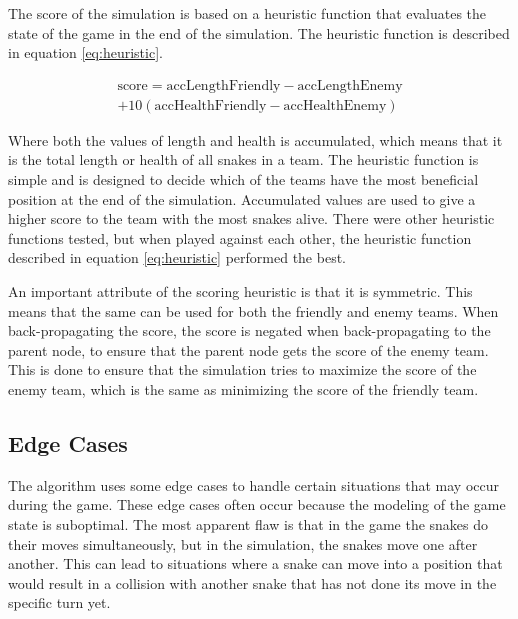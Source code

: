 \documentclass[a4paper,12pt]{article}
\begin{document}
The score of the simulation is based on a heuristic function that evaluates the state of the game in the end of the simulation. The heuristic function is described in equation \ref{eq:heuristic}.


\begin{multline} \label{eq:heuristic}
    \text{score} = \text{accLengthFriendly} - \text{accLengthEnemy}\\ + 10 (\text{accHealthFriendly} - \text{accHealthEnemy})
\end{multline}

Where both the values of length and health is accumulated, which means that it is the total length or health of all snakes in a team. The heuristic function is simple and is designed to decide which of the teams have the most beneficial position at the end of the simulation. Accumulated values are used to give a higher score to the team with the most snakes alive. There were other heuristic functions tested, but when played against each other, the heuristic function described in equation \ref{eq:heuristic} performed the best.

An important attribute of the scoring heuristic is that it is symmetric. This means that the same can be used for both the friendly and enemy teams. When back-propagating the score, the score is negated when back-propagating to the parent node, to ensure that the parent node gets the score of the enemy team. This is done to ensure that the simulation tries to maximize the score of the enemy team, which is the same as minimizing the score of the friendly team.






\subsection{Edge Cases}

The algorithm uses some edge cases to handle certain situations that may occur during the game. These edge cases often occur because the modeling of the game state is suboptimal. The most apparent flaw is that in the game the snakes do their moves simultaneously, but in the simulation, the snakes move one after another. This can lead to situations where a snake can move into a position that would result in a collision with another snake that has not done its move in the specific turn yet.
\end{document}
